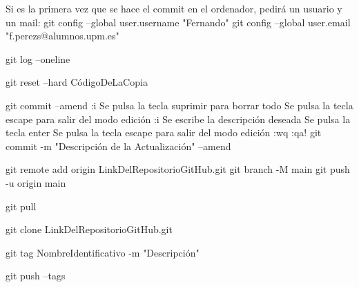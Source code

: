	Si es la primera vez que se hace el commit en el ordenador, pedirá un usuario y un mail:
	git config --global user.username "Fernando"
	git config --global user.email "f.perezs@alumnos.upm.es"

	git log --oneline	%

	git reset --hard CódigoDeLaCopia	%

	git commit --amend		%
		:i		%
		Se pulsa la tecla suprimir para borrar todo
		Se pulsa la tecla escape para salir del modo edición
		:i		%
		Se escribe la descripción deseada
		Se pulsa la tecla enter
		Se pulsa la tecla escape para salir del modo edición
		:wq		%
		:qa!	%
	git commit -m "Descripción de la Actualización" --amend		%



	git remote add origin LinkDelRepositorioGitHub.git		%
	git branch -M main
	git push -u origin main									%

	git pull	%

	git clone LinkDelRepositorioGitHub.git		%


	git tag NombreIdentificativo -m "Descripción"	%

	git push --tags		%





